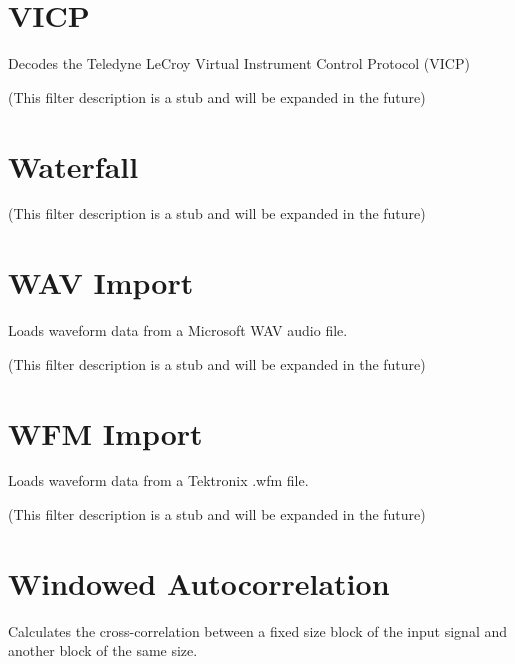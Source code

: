 \pagebreak
\section{VICP}

Decodes the Teledyne LeCroy Virtual Instrument Control Protocol (VICP)

(This filter description is a stub and will be expanded in the future)

\pagebreak
\section{Waterfall}

(This filter description is a stub and will be expanded in the future)

\pagebreak
\section{WAV Import}

Loads waveform data from a Microsoft WAV audio file.

(This filter description is a stub and will be expanded in the future)

\pagebreak
\section{WFM Import}

Loads waveform data from a Tektronix .wfm file.

(This filter description is a stub and will be expanded in the future)

\pagebreak
\section{Windowed Autocorrelation}

Calculates the cross-correlation between a fixed size block of the input signal and another block of the same size.

